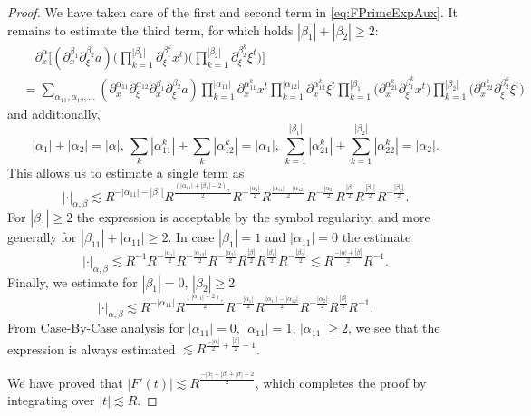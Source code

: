 \documentclass{amsart}
\theoremstyle{definition}
\begin{document}
\begin{proof}
We have taken care of the first and second term in \eqref{eq:FPrimeExpAux}. It remains to estimate the third term, for which holds $|\beta_1|+|\beta_2| \geq 2$:
\begin{equation*}
    \begin{split}
        &\quad \partial_x^{\alpha} \big[ (\partial_x^{\beta_1} \partial_{\xi}^{\beta_2} a) \big( \prod_{k=1}^{|\beta_1|} \partial_{\xi}^{\beta_1^k} x^t \big) \big( \prod_{k=1}^{|\beta_2|} \partial_{\xi}^{\beta_2^k} \xi^t \big) \big] \\
        &= \sum_{\alpha_{11},\alpha_{12},\ldots} (\partial_x^{\alpha_{11}} \partial_{\xi}^{\alpha_{12}} \partial_x^{\beta_1} \partial_{\xi}^{\beta_2} a) \prod_{k=1}^{|\alpha_{11}|} \partial_x^{\alpha_{11}^k} x^t \prod_{k=1}^{|\alpha_{12}|} \partial_x^{\alpha_{12}^k} \xi^t \prod_{k=1}^{|\beta_1|} (\partial_x^{\alpha_{21}^k} \partial_{\xi}^{\beta_1^k} x^t \big) \prod_{k=1}^{|\beta_2|} \big( \partial_x^{\alpha_{22}^k} \partial_{\xi}^{\beta_2^k} \xi^t \big)
    \end{split}
\end{equation*}
and additionally,
\begin{equation*}
|\alpha_1|+|\alpha_2| = |\alpha|, \, \sum_k|\alpha_{11}^k| + \sum_k |\alpha_{12}^k| = |\alpha_1|, \, \sum_{k=1}^{|\beta_1|} |\alpha_{21}^k| + \sum_{k=1}^{|\beta_2|} |\alpha_{22}^k| = |\alpha_2|.
\end{equation*}
This allows us to estimate a single term as
\begin{equation*}
    |\cdot|_{\alpha,\beta} \lesssim R^{-|\alpha_{11}|-|\beta_1|} R^{\frac{(|\alpha_{11}|+|\beta_1|-2)_+}{2}} R^{-\frac{|\alpha_1|}{2}} R^{\frac{|\alpha_{11}|-|\alpha_{12}|}{2}} R^{-\frac{|\alpha_2|}{2}} R^{\frac{|\beta|}{2}} R^{\frac{|\beta_1|}{2}} R^{-\frac{|\beta_2|}{2}}.
\end{equation*}
For $|\beta_1| \geq 2$ the expression is acceptable by the symbol regularity, and more generally for $|\beta_{11}|+|\alpha_{11}| \geq 2$. In case $|\beta_1| = 1$ and $|\alpha_{11}| = 0$ the estimate
\begin{equation*}
     |\cdot|_{\alpha,\beta} \lesssim R^{-1} R^{-\frac{|\alpha_1|}{2}} R^{-\frac{|\alpha_{12}|}{2}} R^{-\frac{|\alpha_2|}{2}} R^{\frac{|\beta|}{2}} R^{\frac{|\beta_1|}{2}} R^{-\frac{|\beta_2|}{2}} \lesssim R^{\frac{-|\alpha|+|\beta|}{2}} R^{-1}.
\end{equation*}
Finally, we estimate for $|\beta_1|=0$, $|\beta_2| \geq 2$
\begin{equation*}
    |\cdot|_{\alpha,\beta} \lesssim R^{-|\alpha_{11}|} R^{\frac{(|\alpha_{11}|-2)_+}{2}} R^{-\frac{|\alpha_1|}{2}} R^{\frac{|\alpha_{11}|-|\alpha_{12}|}{2}} R^{-\frac{|\alpha_2|}{2}} R^{\frac{|\beta|}{2}} R^{-1}.
\end{equation*}
From Case-By-Case analysis for $|\alpha_{11}|=0$, $|\alpha_{11}| = 1$, $|\alpha_{11}| \geq 2$, we see that the expression is always estimated $\lesssim R^{\frac{-|\alpha|}{2}+\frac{|\beta|}{2}-1}$.

\smallskip

We have proved that $|F'(t)| \lesssim R^{\frac{-|\alpha| + |\beta| + |\sigma|-2}{2}}$,
which completes the proof by integrating over $|t| \lesssim R$.
\end{proof}
\end{document}
